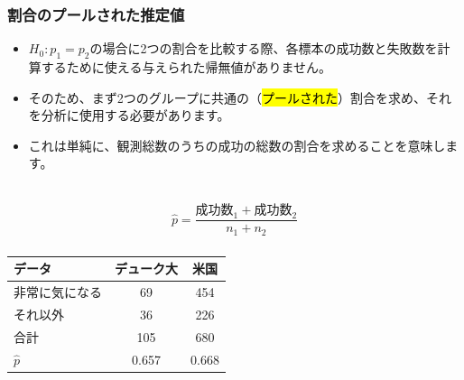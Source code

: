 
\begin{frame}
\frametitle{割合のプールされた推定値}

\begin{itemize}

\item $H_0: p_1 = p_2$の場合に2つの割合を比較する際、各標本の成功数と失敗数を計算するために使える与えられた帰無値がありません。

\item そのため、まず2つのグループに共通の（\hl{プールされた}）割合を求め、それを分析に使用する必要があります。

\item これは単純に、観測総数のうちの成功の総数の割合を求めることを意味します。

\end{itemize}

$\:$ \\

{ \[ \hat{p} = \frac{\text{成功数}_1 + \text{成功数}_2}{n_1 + n_2} \] }

\end{frame}


\begin{frame}
\frametitle{}


{\footnotesize
\begin{center}
\begin{tabular}{l | c c}
データ			& デューク大	& 米国 \\
\hline
非常に気になる	& 69			& 454 \\
それ以外		& 36			& 226 \\
\hline
合計			& 105		& 680 \\
\hline
$\hat{p}$		& 0.657		& 0.668
\end{tabular}
\end{center}
}


\end{frame}

